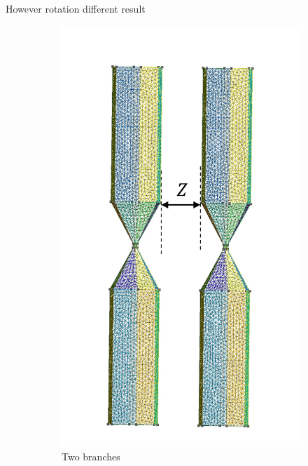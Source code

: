 However rotation different result

\begin{figure}[H]
    \begin{subfigure}{0.3\linewidth}
        \centering
        \includegraphics[scale = 0.4]{figures/2branches}
        \caption{Two branches}
        \end{subfigure}
        \begin{subfigure}{0.3\linewidth}
            \centering

\end{subfigure}
\end{figure}
